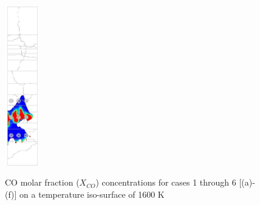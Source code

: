 \documentclass[review]{elsarticle}
\begin{document}
\begin{figure}
{				\includegraphics[height = 7cm]{FBRM05_ISO_COPPM_S}}\\
\caption{CO molar fraction ($X_{CO}$) concentrations for cases 1 through 6 [(a)-(f)] on a temperature iso-surface of 1600 K}
\end{figure}
\end{document}
